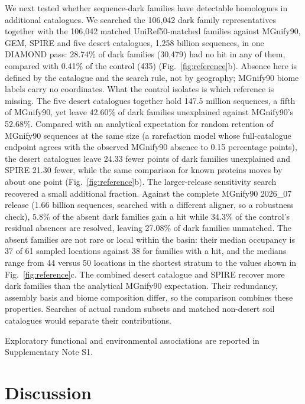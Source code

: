 \documentclass[11pt]{article}
\begin{document}
We next tested whether sequence-dark families have detectable homologues in additional catalogues. We searched
the 106{,}042 dark family representatives together with the 106{,}042 matched UniRef50-matched
families against MGnify90, GEM, SPIRE and five desert catalogues, 1.258 billion sequences, in one
DIAMOND pass: 28.74\% of dark families (30{,}479) had no hit in any of them, compared with 0.41\% of
the control (435) (Fig.~\ref{fig:reference}b). Absence here is defined by the catalogue and the
search rule, not by geography; MGnify90 biome labels carry no coordinates. What the control isolates
is which reference is missing. The five desert catalogues together hold 147.5 million sequences, a
fifth of MGnify90, yet leave 42.60\% of dark families unexplained against MGnify90's 52.68\%.
Compared with an analytical expectation for random retention of MGnify90 sequences at the same size (a rarefaction model whose full-catalogue endpoint agrees with the
observed MGnify90 absence to 0.15 percentage points), the desert catalogues leave 24.33 fewer points
of dark families unexplained and SPIRE 21.30 fewer, while the same comparison for known proteins moves
by about one point (Fig.~\ref{fig:reference}b). The larger-release sensitivity search recovered a small additional fraction. Against the complete
MGnify90 2026\_07 release (1.66 billion sequences, searched with a different aligner, so a robustness
check), 5.8\% of
the absent dark families gain a hit while 34.3\% of the control's residual absences are resolved,
leaving 27.08\% of dark families unmatched. The absent families are not rare or local within the
basin: their median occupancy is 37 of 61 sampled locations against 38 for families with a hit, and
the medians range from 44 versus 50 locations in the shortest stratum to the values shown in Fig.~\ref{fig:reference}c. The combined desert catalogue and SPIRE recover more dark families than the analytical MGnify90
expectation. Their redundancy, assembly basis and biome composition differ, so the comparison
combines these properties. Searches of actual random subsets and matched non-desert soil
catalogues would separate their contributions.

Exploratory functional and environmental associations are reported in Supplementary Note S1.

\section*{Discussion}
\end{document}
